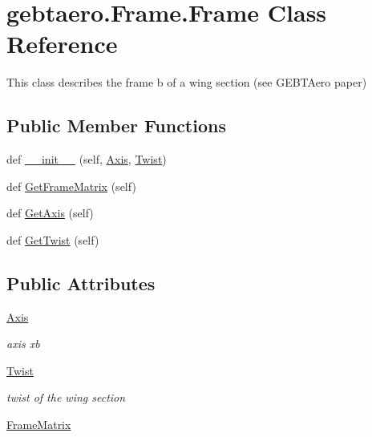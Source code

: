 \hypertarget{classgebtaero_1_1_frame_1_1_frame}{}\section{gebtaero.\+Frame.\+Frame Class Reference}
\label{classgebtaero_1_1_frame_1_1_frame}


This class describes the frame b of a wing section (see G\+E\+B\+T\+Aero paper)  


\subsection*{Public Member Functions}
\begin{DoxyCompactItemize}
\item 
def \hyperlink{classgebtaero_1_1_frame_1_1_frame_a39d919d9d67030dafbe8a4cf44ea53d5}{\+\_\+\+\_\+init\+\_\+\+\_\+} (self, \hyperlink{classgebtaero_1_1_frame_1_1_frame_ae08a3f5d573566b87a5a3f206d312a47}{Axis}, \hyperlink{classgebtaero_1_1_frame_1_1_frame_ab64cc356fbc0c271e985c7d6694e31bc}{Twist})
\item 
def \hyperlink{classgebtaero_1_1_frame_1_1_frame_a4c00a12dd5023ac5220c863d9b806da0}{Get\+Frame\+Matrix} (self)
\item 
def \hyperlink{classgebtaero_1_1_frame_1_1_frame_a72f88d5e0ae61e459545178d564caaf6}{Get\+Axis} (self)
\item 
def \hyperlink{classgebtaero_1_1_frame_1_1_frame_aaf3d8c0081afde32def48d733d95d3a9}{Get\+Twist} (self)
\end{DoxyCompactItemize}
\subsection*{Public Attributes}
\begin{DoxyCompactItemize}
\item 
\hyperlink{classgebtaero_1_1_frame_1_1_frame_ae08a3f5d573566b87a5a3f206d312a47}{Axis}
\begin{DoxyCompactList}\small\item\em axis xb \end{DoxyCompactList}\item 
\hyperlink{classgebtaero_1_1_frame_1_1_frame_ab64cc356fbc0c271e985c7d6694e31bc}{Twist}
\begin{DoxyCompactList}\small\item\em twist of the wing section \end{DoxyCompactList}\item 
\hyperlink{classgebtaero_1_1_frame_1_1_frame_ac066f787b43713ffdce16e36acfbfdee}{Frame\+Matrix}
\end{DoxyCompactItemize}


